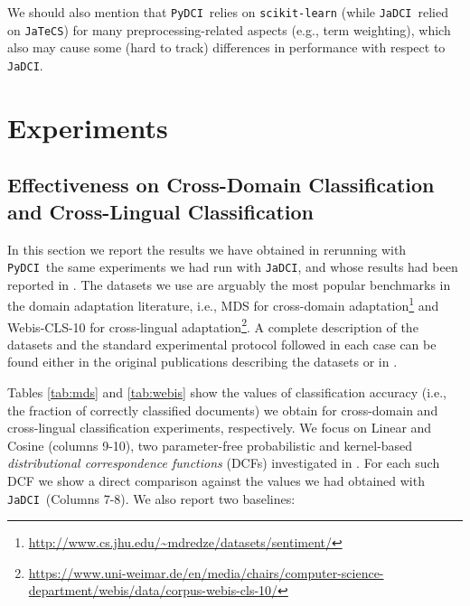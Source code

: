 \documentclass{article}
\newcommand{\jadci}{\texttt{JaDCI}}
\newcommand{\pydci}{\texttt{PyDCI}}
\begin{document}
\noindent We should also mention that \pydci\ relies on
\texttt{scikit-learn} (while \jadci\ relied on \texttt{JaTeCS}) for
many preprocessing-related aspects (e.g., term weighting), which also
may cause some (hard to track) differences in performance with respect
to \jadci.



\section{Experiments}
\label{sec:results}



\subsection{Effectiveness on Cross-Domain Classification and
Cross-Lingual Classification}
\label{sec:effectiveness}

\noindent In this section we report the results we have obtained in
rerunning with \pydci\ the same experiments we had run with \jadci,
and whose results had been reported in \citep{Moreo:2016fg}.  The
datasets we use are arguably the most popular benchmarks in the domain
adaptation literature, i.e., MDS \citep{Blitzer:2007gf} for
cross-domain
adaptation\footnote{\url{http://www.cs.jhu.edu/~mdredze/datasets/sentiment/}}
and Webis-CLS-10 \citep{Prettenhofer:2010ys} for cross-lingual
adaptation\footnote{\url{https://www.uni-weimar.de/en/media/chairs/computer-science-department/webis/data/corpus-webis-cls-10/}}.
A complete description of the datasets and the standard experimental
protocol followed in each case can be found either in the original
publications describing the datasets
\citep{Blitzer:2007gf,Prettenhofer:2010ys} or in \citep{Moreo:2016fg}.


Tables \ref{tab:mds} and \ref{tab:webis} show the values of
classification accuracy (i.e., the fraction of correctly classified
documents) we obtain for cross-domain and cross-lingual classification
experiments, respectively.  We focus on Linear and Cosine (columns
9-10), two parameter-free probabilistic and kernel-based
\emph{distributional correspondence functions} (DCFs) investigated in
\citep{Moreo:2016fg}. For each such DCF we show a direct comparison
against the values we had obtained with \jadci\ (Columns 7-8).  We
also report two baselines:
\end{document}
